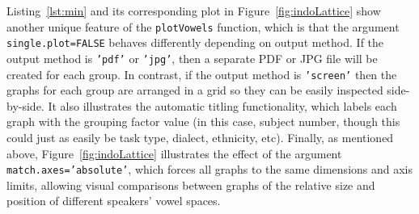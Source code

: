 \documentclass[12pt,oneside]{article}
\begin{document}
Listing~\ref{lst:min} and its corresponding plot in Figure~\ref{fig:indoLattice} show another unique feature of the \texttt{plotVowels} function, which is that the argument \texttt{single.plot=FALSE} behaves differently depending on output method.  If the output method is \texttt{'pdf'} or \texttt{'jpg'}, then a separate PDF or JPG file will be created for each group.  In contrast, if the output method is \texttt{'screen'} then the graphs for each group are arranged in a grid so they can be easily inspected side-by-side.  It also illustrates the automatic titling functionality, which labels each graph with the grouping factor value (in this case, subject number, though this could just as easily be task type, dialect, ethnicity, etc).  Finally, as mentioned above, Figure~\ref{fig:indoLattice} illustrates the effect of the argument \texttt{match.axes='absolute'}, which forces all graphs to the same dimensions and axis limits, allowing visual comparisons between graphs of the relative size and position of different speakers' vowel spaces. 
\end{document}
